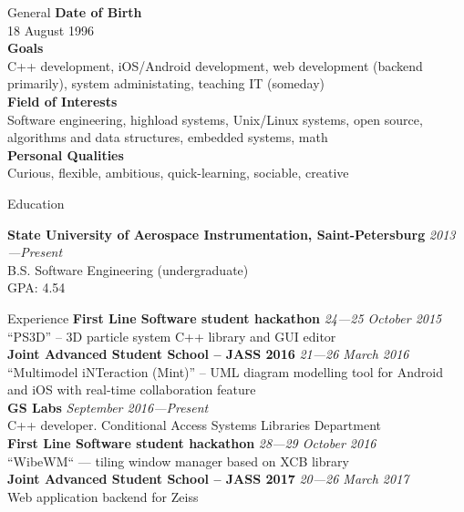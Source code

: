 \documentclass{resume} %
\begin{document}
\begin{rSection}{General}
{\bf Date of Birth} \\
18 August 1996 \\
{\bf Goals} \\
C++ development, iOS\slash Android development, web development (backend primarily),
system administating, teaching IT (someday) \\
{\bf Field of Interests} \\
Software engineering, highload systems, Unix/Linux systems, open source, algorithms and
data structures, embedded systems, math \\
{\bf Personal Qualities} \\
Curious, flexible, ambitious, quick-learning, sociable, creative
\end{rSection}


\begin{rSection}{Education}

{\bf State University of Aerospace Instrumentation, Saint-Petersburg} \hfill {\em 2013---Present} \\ 
B.S. Software Engineering (undergraduate)\\
GPA: 4.54

\end{rSection}


\begin{rSection}{Experience}
{\bf First Line Software student hackathon} \hfill {\em 24---25 October 2015} \\
``PS3D'' -- 3D particle system C++ library and GUI editor \\
{\bf Joint Advanced Student School -- JASS 2016} \hfill {\em 21---26 March 2016} \\
``Multimodel iNTeraction (Mint)'' -- UML diagram modelling tool for Android and iOS with real-time 
collaboration feature \\
{\bf GS Labs} \hfill {\em September 2016---Present} \\
C++ developer. Conditional Access Systems Libraries Department \\
{\bf First Line Software student hackathon} \hfill {\em 28---29 October 2016} \\
``WibeWM`` --- tiling window manager based on XCB library \\
{\bf Joint Advanced Student School -- JASS 2017} \hfill {\em 20---26 March 2017} \\
Web application backend for Zeiss \\

\end{rSection}
\end{document}
